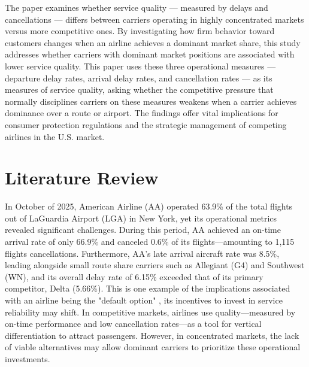 \documentclass[preprint,12pt,authoryear]{elsarticle}
\begin{document}
The paper examines whether service quality --- measured by delays and cancellations --- differs between carriers operating in highly concentrated markets versus more competitive ones.  By investigating how firm behavior toward customers changes when an airline achieves a dominant market share, this study addresses whether carriers with dominant market positions are associated with lower service quality. This paper uses these three operational measures — departure delay rates, arrival delay rates, and cancellation rates — as its measures of service quality, asking whether the competitive pressure that normally disciplines carriers on these measures weakens when a carrier achieves dominance over a route or airport. The findings offer vital implications for consumer protection regulations and the strategic management of competing airlines in the U.S. market.

\section{Literature Review}
\label{sec:background}

In October of 2025, American Airline (AA) operated  63.9\% of the total flights out of LaGuardia Airport (LGA) in New York, yet its operational metrics revealed significant challenges. During this period, AA achieved an on-time arrival rate of only 66.9\% and canceled 0.6\% of its flights—amounting to 1,115 flights cancellations. Furthermore, AA's late arrival aircraft rate was 8.5\%, leading alongside small route share carriers such as Allegiant (G4) and Southwest (WN), and its overall delay rate of 6.15\% exceeded that of its primary competitor, Delta (5.66\%). This is one example of the implications associated with an airline being the "default option" , its incentives to invest in service reliability may shift. In competitive markets, airlines use quality—measured by on-time performance and low cancellation rates—as a tool for vertical differentiation to attract passengers. However, in concentrated markets, the lack of viable alternatives may allow dominant carriers to prioritize these operational investments. 
\end{document}

